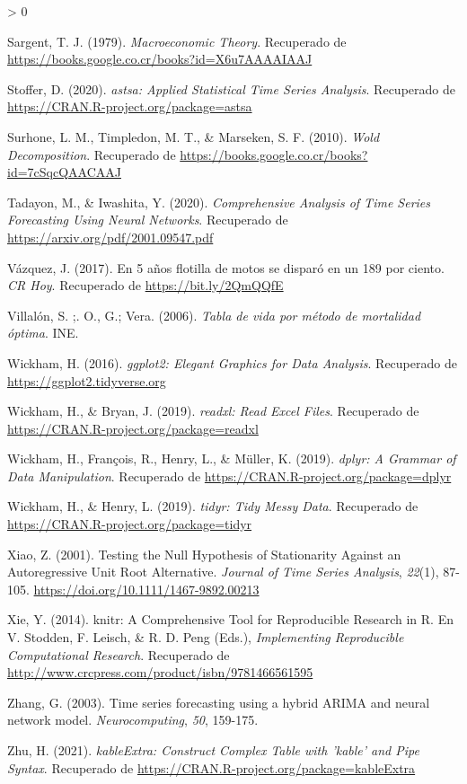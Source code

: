 \documentclass[
]{article}
\newlength{\cslhangindent}
\newenvironment{CSLReferences}[2] %
 {%
  \setlength{\parindent}{0pt}
  \ifodd #1 \everypar{\setlength{\hangindent}{\cslhangindent}}\ignorespaces\fi
  \ifnum #2 > 0
  \setlength{\parskip}{#2\baselineskip}
  \fi
 }%
 {}
\begin{document}
\begin{CSLReferences}{1}{0}
\leavevmode\hypertarget{ref-sargent_macro}{}%
Sargent, T. J. (1979). \emph{Macroeconomic Theory}. Recuperado de
\url{https://books.google.co.cr/books?id=X6u7AAAAIAAJ}

\leavevmode\hypertarget{ref-astsa}{}%
Stoffer, D. (2020). \emph{astsa: Applied Statistical Time Series
Analysis}. Recuperado de \url{https://CRAN.R-project.org/package=astsa}

\leavevmode\hypertarget{ref-Wold}{}%
Surhone, L. M., Timpledon, M. T., \& Marseken, S. F. (2010). \emph{Wold
Decomposition}. Recuperado de
\url{https://books.google.co.cr/books?id=7cSqcQAACAAJ}

\leavevmode\hypertarget{ref-redes}{}%
Tadayon, M., \& Iwashita, Y. (2020). \emph{Comprehensive Analysis of
Time Series Forecasting Using Neural Networks}. Recuperado de
\url{https://arxiv.org/pdf/2001.09547.pdf}

\leavevmode\hypertarget{ref-motos}{}%
Vázquez, J. (2017). En 5 años flotilla de motos se disparó en un 189 por
ciento. \emph{CR Hoy}. Recuperado de \url{https://bit.ly/2QmQQfE}

\leavevmode\hypertarget{ref-mortalidad_optima}{}%
Villalón, S. ;. O., G.; Vera. (2006). \emph{Tabla de vida por método de
mortalidad óptima}. INE.

\leavevmode\hypertarget{ref-ggplot2}{}%
Wickham, H. (2016). \emph{ggplot2: Elegant Graphics for Data Analysis}.
Recuperado de \url{https://ggplot2.tidyverse.org}

\leavevmode\hypertarget{ref-readxl}{}%
Wickham, H., \& Bryan, J. (2019). \emph{readxl: Read Excel Files}.
Recuperado de \url{https://CRAN.R-project.org/package=readxl}

\leavevmode\hypertarget{ref-dplyr}{}%
Wickham, H., François, R., Henry, L., \& Müller, K. (2019). \emph{dplyr:
A Grammar of Data Manipulation}. Recuperado de
\url{https://CRAN.R-project.org/package=dplyr}

\leavevmode\hypertarget{ref-tidyr}{}%
Wickham, H., \& Henry, L. (2019). \emph{tidyr: Tidy Messy Data}.
Recuperado de \url{https://CRAN.R-project.org/package=tidyr}

\leavevmode\hypertarget{ref-doi:10.1111ux2f1467-9892.00213}{}%
Xiao, Z. (2001). Testing the Null Hypothesis of Stationarity Against an
Autoregressive Unit Root Alternative. \emph{Journal of Time Series
Analysis}, \emph{22}(1), 87-105.
\url{https://doi.org/10.1111/1467-9892.00213}

\leavevmode\hypertarget{ref-knitr}{}%
Xie, Y. (2014). knitr: A Comprehensive Tool for Reproducible Research in
{R}. En V. Stodden, F. Leisch, \& R. D. Peng (Eds.), \emph{Implementing
Reproducible Computational Research}. Recuperado de
\url{http://www.crcpress.com/product/isbn/9781466561595}

\leavevmode\hypertarget{ref-Zhang}{}%
Zhang, G. (2003). Time series forecasting using a hybrid ARIMA and
neural network model. \emph{Neurocomputing}, \emph{50}, 159-175.

\leavevmode\hypertarget{ref-kableExtra}{}%
Zhu, H. (2021). \emph{kableExtra: Construct Complex Table with 'kable'
and Pipe Syntax}. Recuperado de
\url{https://CRAN.R-project.org/package=kableExtra}

\end{CSLReferences}
\end{document}
